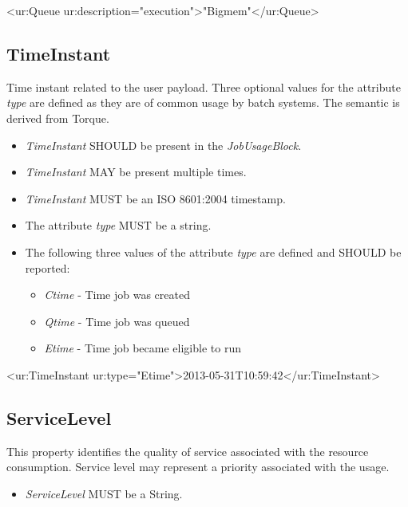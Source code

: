 \begin{XMLexample}
<ur:Queue ur:description="execution">"Bigmem"</ur:Queue>
\end{XMLexample}






\subsection{TimeInstant} \label{JobTimeInstant}

Time instant related to the user payload. Three optional values for the attribute \emph{type} are defined as they are of common usage by batch systems. The semantic is derived from Torque.

\begin{itemize}
\item \emph{TimeInstant} SHOULD be present in the \emph{JobUsageBlock}.
\item \emph{TimeInstant} MAY be present multiple times.
\item \emph{TimeInstant} MUST be an ISO 8601:2004 timestamp.
\item The attribute \emph{type} MUST be a string.
\item The following three values of the attribute \emph{type} are defined and SHOULD be reported:
\begin{itemize}
\item \emph{Ctime} - Time job was created
\item \emph{Qtime} - Time job was queued
\item \emph{Etime} - Time job became eligible to run
\end{itemize}
\end{itemize}

\begin{XMLexample}
<ur:TimeInstant ur:type="Etime">2013-05-31T10:59:42</ur:TimeInstant>
\end{XMLexample}






\subsection{ServiceLevel} \label{JobServiceLevel}

This property identifies the quality of service associated with the resource consumption.
Service level may represent a priority associated with the usage.
\begin{itemize}
\item \emph{ServiceLevel} MUST be a String.
\end{itemize}

